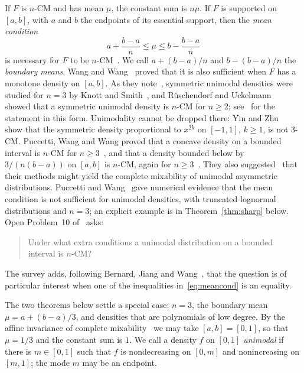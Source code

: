 \documentclass[11pt]{amsart}
\theoremstyle{remark}
\numberwithin{equation}{section}
\begin{document}
If $F$ is $n$-CM and has mean $\mu$, the constant sum is $n\mu$. If $F$ is
supported on $[a,b]$, with $a$ and $b$ the endpoints of its essential support,
then the \emph{mean condition}
\begin{equation}\label{eq:meancond}
a+\frac{b-a}{n}\le\mu\le b-\frac{b-a}{n}
\end{equation}
is necessary for $F$ to be $n$-CM~\cite[Proposition~2.1(7)]{WW11}. We call
$a+(b-a)/n$ and $b-(b-a)/n$ the \emph{boundary means}. Wang and
Wang~\cite[Theorem~2.4 and Corollary~2.9]{WW11} proved that it is also
sufficient when $F$ has a monotone density on $[a,b]$. As they
note~\cite[Section~1]{WW11}, symmetric unimodal densities were studied for
$n=3$ by Knott and Smith~\cite{KS06}, and
R\"uschendorf and Uckelmann~\cite{RU02} showed that a symmetric unimodal
density is $n$-CM for $n\ge2$; see~\cite[Theorem~2.2]{WW11} for the statement
in this form.
Unimodality cannot be dropped there: Yin and Zhu~\cite[Example~2.3]{YZ17}
show that the symmetric density proportional to $x^{2k}$ on $[-1,1]$,
$k\ge1$, is not $3$-CM.
Puccetti, Wang and Wang proved that a concave density on a bounded interval
is $n$-CM for $n\ge3$~\cite[Theorem~4.2]{PWW12}, and that a density bounded
below by $3/(n(b-a))$ on $[a,b]$ is $n$-CM, again for
$n\ge3$~\cite[Theorem~3.4]{PWW13}.
They also suggested~\cite[Section~6]{PWW12} that their methods
might yield the complete mixability of unimodal asymmetric distributions.
Puccetti and Wang~\cite[Tables~3 and~4]{PW15} gave numerical evidence that the mean
condition is not sufficient for unimodal densities, with truncated
lognormal distributions and $n=3$; an explicit example is in
Theorem~\ref{thm:sharp} below. Open Problem~10 of~\cite{Wan15} asks:
\begin{quote}
Under what extra conditions a unimodal distribution on a bounded interval
is $n$-CM?
\end{quote}
The survey adds, following Bernard, Jiang and Wang~\cite{BJW14}, that the
question is of particular interest when one of the inequalities
in~\eqref{eq:meancond} is an equality.

The two theorems below settle a special case: $n=3$, the boundary mean
$\mu=a+(b-a)/3$, and densities that are polynomials of low degree. By the
affine invariance of complete mixability~\cite[Proposition~2.1(1)]{WW11} we
may take $[a,b]=[0,1]$, so that $\mu=1/3$ and the constant sum is $1$. We
call a density $f$ on $[0,1]$ \emph{unimodal} if there is $m\in[0,1]$ such
that $f$ is nondecreasing on $[0,m]$ and nonincreasing on $[m,1]$; the mode
$m$ may be an endpoint.
\end{document}
